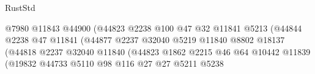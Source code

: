 \begin{lexlean}{RustStd}
\begin{coremodule}
                                                    @7980
                                                    @11843
                                                    @44900
                                                    (@44823
                                                      @2238
                                                      @100
                                                      @47
                                                      @32
                                                      @11841
                                                      @5213
                                                      (@44844
                                                        @2238
                                                        @47
                                                        @11841
                                                        (@44877
                                                          @2237
                                                          @32040
                                                          @5219
                                                          @11840
                                                          @8802
                                                          @18137
                                                          (@44818
                                                            @2237
                                                            @32040
                                                            @11840
                                                            (@44823
                                                              @1862
                                                              @2215
                                                              @46
                                                              @64
                                                              @10442
                                                              @11839
                                                              (@19832
                                                                @44733
                                                                @5110
                                                                @98
                                                                @116
                                                                @27
                                                                @27
                                                                @5211
                                                                @5238

\end{coremodule}
\end{lexlean}
